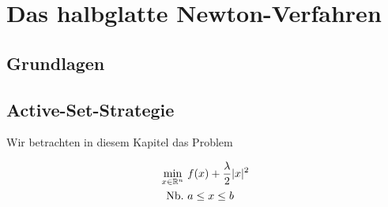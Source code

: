 \chapter{Das halbglatte Newton-Verfahren}

\section{Grundlagen}


\section{Active-Set-Strategie}

Wir betrachten in diesem Kapitel das Problem
\begin{definition}
\begin{align}
  \min_{x \in \R^n}\ & f(x) + \frac{\lambda}{2} |x|^2 \\
                 \nb & a \leq x \leq b
\end{align}
\end{definition}


